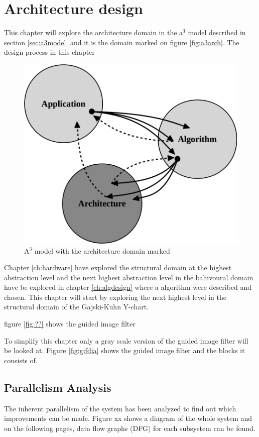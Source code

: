 \chapter{Architecture design} \label{ch:archdesign}

This chapter will explore the architecture domain in the a$^3$ model described in section \vref{sec:a3model} and it is the domain marked on figure \vref{fig:a3arch}. The design process in this chapter\\
\begin{figure}[ht!]
  \centering
  \includegraphics[scale=0.25]{figures/a3arch}
  \caption{A$^3$ model with the architecture domain marked}
  \label{fig:arch}
\end{figure}

Chapter \vref{ch:hardware} have explored the structural domain at the highest abstraction level
and the next highest abstraction level in the bahivoural domain have be explored in chapter \vref{ch:algdesign} where a algorithm were described and chosen. This chapter will start by exploring the next highest level in the structural domain of the Gajski-Kuhn Y-chart.

figure \vref{fig:??} shows the guided image filter

To simplify this chapter only a gray scale version of the guided image filter will be looked at. Figure \vref{fig:gifdia} shows the guided image filter and the blocks it consists of. 


\section{Parallelism Analysis}\label{sec:paraanal}
The inherent parallelism of the system has been analyzed to find out which improvements can be made. Figure xx shows a diagram of the whole system and on the following pages, data flow graphs (DFG) for each subsystem can be found. \\

